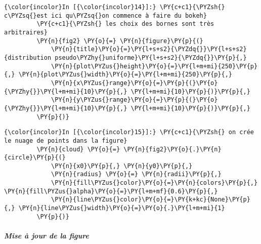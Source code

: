     \begin{Verbatim}[commandchars=\\\{\},frame=single,framerule=0.3mm,rulecolor=\color{cellframecolor}]
{\color{incolor}In [{\color{incolor}14}]:} \PY{c+c1}{\PYZsh{} c\PYZsq{}est ici qu\PYZsq{}on commence à faire du bokeh}
         \PY{c+c1}{\PYZsh{} les choix des bornes sont très arbitraires}
         \PY{n}{fig2} \PY{o}{=} \PY{n}{figure}\PY{p}{(}
             \PY{n}{title}\PY{o}{=}\PY{l+s+s2}{\PYZdq{}}\PY{l+s+s2}{distribution pseudo\PYZhy{}uniforme}\PY{l+s+s2}{\PYZdq{}}\PY{p}{,}
             \PY{n}{plot\PYZus{}height}\PY{o}{=}\PY{l+m+mi}{250}\PY{p}{,} \PY{n}{plot\PYZus{}width}\PY{o}{=}\PY{l+m+mi}{250}\PY{p}{,}
             \PY{n}{x\PYZus{}range}\PY{o}{=}\PY{p}{(}\PY{o}{\PYZhy{}}\PY{l+m+mi}{10}\PY{p}{,} \PY{l+m+mi}{10}\PY{p}{)}\PY{p}{,}
             \PY{n}{y\PYZus{}range}\PY{o}{=}\PY{p}{(}\PY{o}{\PYZhy{}}\PY{l+m+mi}{10}\PY{p}{,} \PY{l+m+mi}{10}\PY{p}{)}\PY{p}{,}
         \PY{p}{)}
\end{Verbatim}


    \begin{Verbatim}[commandchars=\\\{\},frame=single,framerule=0.3mm,rulecolor=\color{cellframecolor}]
{\color{incolor}In [{\color{incolor}15}]:} \PY{c+c1}{\PYZsh{} on crée le nuage de points dans la figure}
         \PY{n}{cloud} \PY{o}{=} \PY{n}{fig2}\PY{o}{.}\PY{n}{circle}\PY{p}{(}
             \PY{n}{x0}\PY{p}{,} \PY{n}{y0}\PY{p}{,}
             \PY{n}{radius} \PY{o}{=} \PY{n}{radii}\PY{p}{,}
             \PY{n}{fill\PYZus{}color}\PY{o}{=}\PY{n}{colors}\PY{p}{,} \PY{n}{fill\PYZus{}alpha}\PY{o}{=}\PY{l+m+mf}{0.6}\PY{p}{,}
             \PY{n}{line\PYZus{}color}\PY{o}{=}\PY{k+kc}{None}\PY{p}{,} \PY{n}{line\PYZus{}width}\PY{o}{=}\PY{o}{.}\PY{l+m+mi}{1}
         \PY{p}{)}
\end{Verbatim}


    \hypertarget{mise-uxe0-jour-de-la-figure}{%
\subparagraph{Mise à jour de la
figure}\label{mise-uxe0-jour-de-la-figure}}

